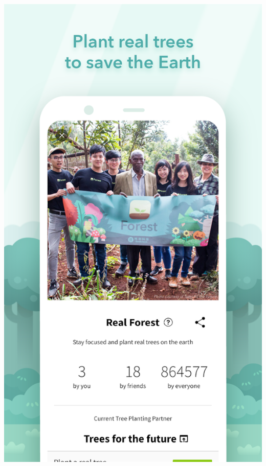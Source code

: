 \documentclass[11pt]{article}
\begin{document}
\begin{itemize}
\begin{center}
\includegraphics[width=.9\linewidth]{./docs/3.png}
\end{center}
\begin{center}

\end{center}
\end{itemize}
\end{document}
